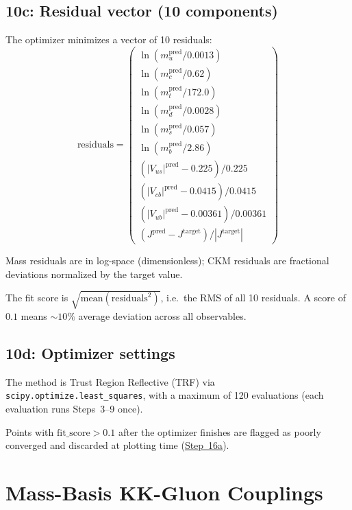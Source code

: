 \documentclass[11pt]{article}
\begin{document}
\subsection{10c: Residual vector (10 components)}
\label{sec:step10c}

The optimizer minimizes a vector of 10 residuals:
\begin{equation}
\text{residuals} = \begin{pmatrix}
  \ln(m_u^{\mathrm{pred}}/0.0013) \\[2pt]
  \ln(m_c^{\mathrm{pred}}/0.62) \\[2pt]
  \ln(m_t^{\mathrm{pred}}/172.0) \\[2pt]
  \ln(m_d^{\mathrm{pred}}/0.0028) \\[2pt]
  \ln(m_s^{\mathrm{pred}}/0.057) \\[2pt]
  \ln(m_b^{\mathrm{pred}}/2.86) \\[2pt]
  (|V_{us}|^{\mathrm{pred}} - 0.225) / 0.225 \\[2pt]
  (|V_{cb}|^{\mathrm{pred}} - 0.0415) / 0.0415 \\[2pt]
  (|V_{ub}|^{\mathrm{pred}} - 0.00361) / 0.00361 \\[2pt]
  (J^{\mathrm{pred}} - J^{\mathrm{target}}) / |J^{\mathrm{target}}|
\end{pmatrix}
\end{equation}

Mass residuals are in log-space (dimensionless); CKM residuals are fractional
deviations normalized by the target value.

The fit score is $\sqrt{\mathrm{mean}(\text{residuals}^2)}$, i.e.\ the RMS of
all 10 residuals.  A score of~$0.1$ means $\sim 10\%$ average deviation across
all observables.

\subsection{10d: Optimizer settings}
\label{sec:step10d}

The method is Trust Region Reflective (TRF) via
\texttt{scipy.optimize.least\_squares}, with a maximum of 120 evaluations (each
evaluation runs Steps~3--9 once).

Points with $\text{fit\_score} > 0.1$ after the optimizer finishes are flagged
as poorly converged and discarded at plotting time
(\hyperref[sec:step16a]{Step~16a}).

\section{Mass-Basis KK-Gluon Couplings}
\label{sec:step11}
\end{document}
